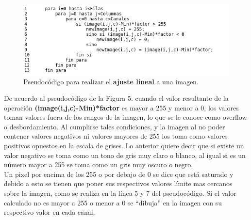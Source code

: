 \documentclass[conference]{IEEEtran}
\begin{document}
\begin{figure}[h]
	\begin{center}
		\setlength{\unitlength}{0.00105in}
		\includegraphics[scale=0.55]{./images/algoritmo.png}
	\end{center}
	\caption{Pseudoc\'odigo para realizar el \textbf{ajuste lineal} a una imagen.}
\end{figure}


De acuerdo al pseudoc\'odigo de la Figura 5. cuando el valor resultante de la operaci\'on \textbf{(image(i,j,c)-Min)*factor} es mayor a 255 y menor a 0, los valores toman valores fuera de los rangos de la imagen, lo que se le conoce como overflow o desbordamiento. Al cumplirse tales condiciones, y la imagen al no poder contener valores negativos ni valores mayores de 255 los toma como valores positivos opuestos en la escala de grises. Lo anterior quiere decir que si existe un valor negativo se toma como un tono de gris muy claro o blanco, al igual si es un n\'umero mayor a 255 se toma como un gris muy oscuro o negro.\\ Un pixel por encima de los 255 o por debajo de 0 se dice que est\'a saturado y debido a esto se tienen que poner sus respectivos valores l\'imite mas cercanos sobre la imagen, como se realiza en la l\'inea 5 y 7 del pseudoc\'odigo. Si el valor calculado no es mayor a 255 o menor a 0 se ``dibuja'' en la imagen con su respectivo valor en cada canal.\\\\
\end{document}
